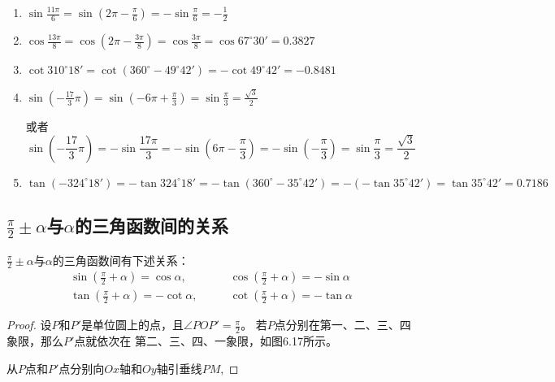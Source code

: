 \begin{solution}
\begin{enumerate}
    \item $\sin\frac{11\pi}{6}=\sin\left(2\pi-\frac{\pi}{6}\right)=-\sin\frac{\pi}{6}=-\frac{1}{2}$
    \item $\cos\frac{13\pi}{8}=\cos\left(2\pi-\frac{3\pi}{8}\right)=\cos\frac{3\pi}{8}=\cos67^{\circ}30'=0.3827$
    \item $\cot310^{\circ}18'=\cot(360^{\circ}-49^{\circ}42')=-\cot49^{\circ}42'=-0.8481$
    \item $\sin\left(-\frac{17}{3}\pi\right)=\sin\left(-6\pi+\frac{\pi}{3}\right)=\sin\frac{\pi}{3}=\frac{\sqrt{3}}{2}$
    
或者
\[\sin\left(-\frac{17}{3}\pi\right)=-\sin\frac{17\pi}{3}=-\sin\left(6\pi-\frac{\pi}{3}\right)=-\sin\left(-\frac{\pi}{3}\right)=\sin\frac{\pi}{3}=\frac{\sqrt{3}}{2}\]

    \item $\tan(-324^{\circ}18')=-\tan324^{\circ}18'=-\tan(360^{\circ}-35^{\circ}42')=-(-\tan 35^{\circ}42')=\tan 35^{\circ}42'=0.7186$
\end{enumerate}    
\end{solution}

\subsection{$\frac{\pi}{2}\pm\alpha$与$\alpha$的三角函数间的关系}

$\frac{\pi}{2}\pm\alpha$与$\alpha$的三角函数间有下述关系：
\begin{equation}
    \begin{split}
\sin\left(\frac{\pi}{2}+\alpha\right)=\cos\alpha,&\qquad \cos\left(\frac{\pi}{2}+\alpha\right)=-\sin\alpha\\
\tan\left(\frac{\pi}{2}+\alpha\right)=-\cot\alpha,&\qquad \cot\left(\frac{\pi}{2}+\alpha\right)=-\tan\alpha        
    \end{split}
\end{equation}

\begin{proof}
    设$P$和$P'$是单位圆上的点，且$\angle POP'=\frac{\pi}{2}$。
    若$P$点分别在第一、二、三、四象限，那么$P'$点就依次在
    第二、三、四、一象限，如图6.17所示。
\begin{figure}[htp]
    \centering
{}
    \caption{}
\end{figure}

    从$P$点和$P'$点分别向$Ox$轴和$Oy$轴引垂线$PM$, 

    
\end{proof}

